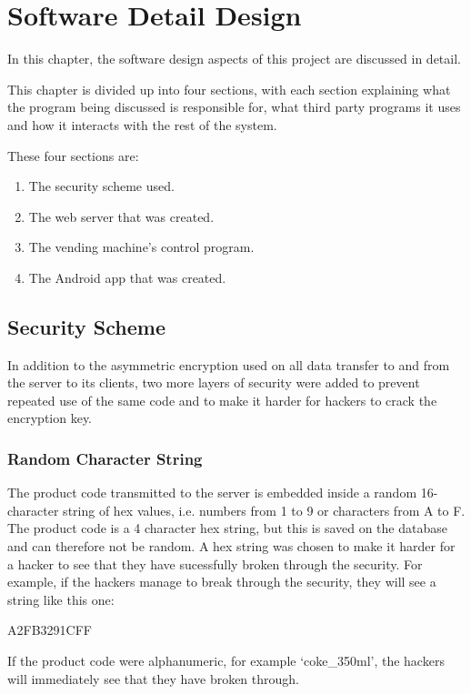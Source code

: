 \chapter{Software Detail Design}
\label{chap:4}

In this chapter, the software design aspects of this project are discussed in
detail.

This chapter is divided up into four sections, with each section explaining what
the program being discussed is responsible for, what third party programs it
uses and how it interacts with the rest of the system. 

These four sections are:

\begin{enumerate}
  \item The security scheme used.
  \item The web server that was created.
  \item The vending machine's control program.
  \item The Android app that was created.
\end{enumerate}

\section{Security Scheme}
\label{sec:security-code-scheme}

In addition to the asymmetric encryption used on all data transfer to and from
the server to its clients, two more layers of security were added to prevent
repeated use of the same code and to make it harder for hackers to crack the
encryption key.

\subsection{Random Character String}

The product code transmitted to the server is embedded inside a
random 16-character string of hex values, i.e. numbers from 1 to 9 or characters
from A to F. The product code is a 4 character hex string, but this is saved on
the database and can therefore not be random. A hex string was chosen to make it harder for a hacker to see that they have sucessfully broken through the security.
For example, if the hackers manage to break through the security, they will see a string like this one:

A2FB3291CFF

If the product code were alphanumeric, for example `coke_350ml', the hackers will immediately see that they have broken through. 

